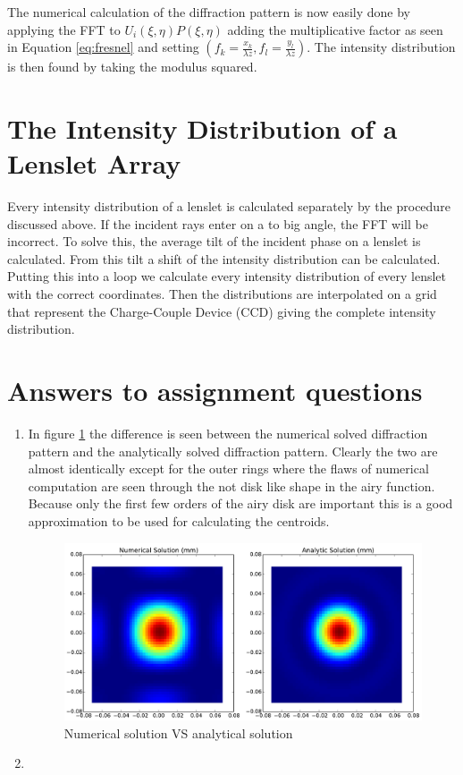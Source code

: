 \documentclass{article}
\begin{document}
The numerical calculation of the diffraction pattern is now easily done by applying the FFT to $U_i(\xi,\eta)P(\xi,\eta)$ adding the multiplicative factor as seen in Equation \eqref{eq:fresnel} and setting $(f_k=\frac{x_k}{\lambda z},f_l=\frac{y_l}{\lambda z})$. The intensity distribution is then found by taking the modulus squared.

\section{The Intensity Distribution of a Lenslet Array}
Every intensity distribution of a lenslet is calculated separately by the procedure discussed above.
If the incident rays enter on a to big angle, the FFT will be incorrect. To solve this, the average tilt of the incident phase on a lenslet is calculated. From this tilt a shift of the intensity distribution can be calculated. Putting this into a loop we calculate every intensity distribution of every lenslet with the correct coordinates. Then the distributions are interpolated on a grid that represent the Charge-Couple Device (CCD) giving the complete intensity distribution. 

\section{Answers to assignment questions} 
\begin{enumerate}
\item 
	In figure \ref{fig:num_vs_an} the difference is seen between the numerical solved diffraction pattern and the analytically solved diffraction pattern. Clearly the two are almost identically except for the outer rings where the flaws of numerical computation are seen through the not disk like shape in the airy function. Because only the first few orders of the airy disk are important this is a good approximation to be used for calculating the centroids. 
	\begin{figure}[H]
		\centering
			\includegraphics[width=1.0\textwidth]{./figures/num_vs_an.pdf}
		\caption{Numerical solution VS analytical solution}
		\label{fig:num_vs_an}
	\end{figure}
\item

\end{enumerate}
\end{document}
